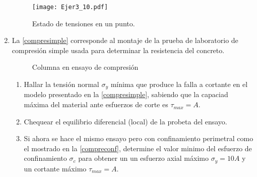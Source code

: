 \documentclass[../notas medios.tex]{subfiles}
\begin{document}
\begin{enumerate}
%
\begin{figure}[H]
	\centering
	\texttt{[image: Ejer3\_10.pdf]}
	\caption{Estado de tensiones en un punto.}
	\label{super:cuna-square}
\end{figure}
%
\item \label{punto11} La \cref{compresimple} corresponde al montaje
de la prueba de laboratorio de compresi\'on simple usada para determinar la resistencia del concreto.\\
%
\begin{figure}[H]	
	\centering	
	\hspace{10mm}
	\caption{Columna en ensayo de compresión}
\end{figure}
%
\begin{enumerate}
	\item Hallar la tensión normal $\sigma_y$ m\'inima que produce la falla a cortante en el modelo presentado en la \cref{compresimple}, sabiendo que la capaciad m\'axima del material ante esfuerzos de corte es $\tau_{max}=A$.
	\item Chequear el equilibrio diferencial (local) de la probeta del ensayo.
	\item Si ahora se hace el mismo ensayo pero con confinamiento perimetral como el mostrado en la \cref{compreconf}, determine el valor minimo del esfuerzo de confinamiento $\sigma_c$ para obtener un un  esfuerzo axial máximo $\sigma_y = 10A$ y un cortante máximo  $\tau_{max}=A$.
\end{enumerate}


\end{enumerate}
\end{document}
